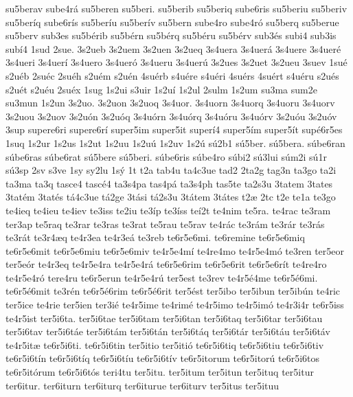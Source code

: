 {su5berav
sube4r^^e1
su5beren
su5beri.
su5berib
su5beriq
sube6ris
su5beriu
su5beriv
su5ber^^edq
sube6r^^eds
su5ber^^edu
su5ber^^edv
su5bern
sube4ro
sube4r^^f3
su5berq
su5berue
su5berv
sub3es
su5b^^e9rib
su5b^^e9rn
su5b^^e9rq
su5b^^e9ru
su5b^^e9rv
sub3^^e9s
subi4
sub3is
sub^^ed4
1sud
2sue.
3s2ueb
3s2uem
3s2uen
3s2ueq
3s4uera
3s4uer^^e1
3s4uere
3s4uer^^e9
3s4ueri
3s4uer^^ed
3s4uero
3s4uer^^f3
3s4ueru
3s4uer^^fa
3s2ues
3s2uet
3s2ueu
3suev
1su^^e9
s2u^^e9b
2su^^e9c
2su^^e9h
s2u^^e9m
s2u^^e9n
4su^^e9rb
s4u^^e9re
s4u^^e9ri
4su^^e9rs
4su^^e9rt
s4u^^e9ru
s2u^^e9s
s2u^^e9t
s2u^^e9u
2su^^e9x
1sug
1s2ui
s3uir
1s2u^^ed
1s2ul
2sulm
1s2um
su3ma
sum2e
su3mun
1s2un
3s2uo.
3s2uon
3s2uoq
3s4uor.
3s4uorn
3s4uorq
3s4uoru
3s4uorv
3s2uou
3s2uov
3s2u^^f3n
3s2u^^f3q
3s4u^^f3rn
3s4u^^f3rq
3s4u^^f3ru
3s4u^^f3rv
3s2u^^f3u
3s2u^^f3v
3sup
supere6ri
supere6r^^ed
super5im
super5it
super^^ed4
super5^^edm
super5^^edt
sup^^e96r5es
1suq
1s2ur
1s2us
1s2ut
1s2uu
1s2u^^fa
1s2uv
1s2^^fa
s^^fa2b1
s^^fa5ber.
s^^fa5bera.
s^^fabe6ran
s^^fabe6ras
s^^fabe6rat
s^^fa5bere
s^^fa5beri.
s^^fabe6ris
s^^fabe4ro
s^^fabi2
s^^fa3lui
s^^fam2i
s^^fa1r
s^^fa3sp
2sv
s3ve
1sy
sy2lu
1s^^fd
1t
t2a
tab4u
ta4c3ue
tad2
2ta2g
tag3n
ta3go
ta2i
ta3ma
ta3q
tasce4
tasc^^e94
ta3s4pa
tas4p^^e1
ta3s4ph
tas5te
ta2s3u
3tatem
3tates
3tat^^e9m
3tat^^e9s
t^^e14c3ue
t^^e12ge
3t^^e1si
t^^e12s3u
3t^^e1tem
3t^^e1tes
t2^^e6
2tc
t2e
te1a
te3go
te4ieq
te4ieu
te4iev
te3iss
te2iu
te3^^edp
te3^^edss
te^^ed2t
te4nim
te5ra.
te4rac
te3ram
ter3ap
te5raq
te3rar
te3ras
te3rat
te5rau
te5rav
te4r^^e1c
te3r^^e1m
te3r^^e1r
te3r^^e1s
te3r^^e1t
te3r4^^e6q
te4r3ea
te4r3e^^e1
te3reb
te6r5e6mi.
te6remine
te6r5e6miq
te6r5e6mit
te6r5e6miu
te6r5e6miv
te4r5e4m^^ed
te4re4mo
te4r5e4m^^f3
te3ren
ter5eor
ter5e^^f3r
te4r3eq
te4r5e4ra
te4r5e4r^^e1
te6r5e6rim
te6r5e6rit
te6r5e6r^^edt
te4re4ro
te4r5e4r^^f3
tere4ru
te6r5erun
te4r5e4r^^fa
ter5est
te3rev
te4r5^^e94me
te6r5^^e96mi.
te6r5^^e96mit
te3r^^e9n
te6r5^^e96rim
te6r5^^e96rit
ter5^^e9st
ter5ibo
ter5ibun
ter5ib^^fan
te4ric
ter5ice
te4rie
ter5ien
ter3i^^e9
te4r5ime
te4rim^^e9
te4r5imo
te4r5im^^f3
te4r3i4r
te6r5iss
te4r5ist
ter5i6ta.
ter5i6tae
ter5i6tam
ter5i6tan
ter5i6taq
ter5i6tar
ter5i6tau
ter5i6tav
ter5i6t^^e1e
ter5i6t^^e1m
ter5i6t^^e1n
ter5i6t^^e1q
ter5i6t^^e1r
ter5i6t^^e1u
ter5i6t^^e1v
te4r5it^^e6
te6r5i6ti.
te6r5i6tin
ter5itio
ter5iti^^f3
te6r5i6tiq
te6r5i6tiu
te6r5i6tiv
te6r5i6t^^edn
te6r5i6t^^edq
te6r5i6t^^edu
te6r5i6t^^edv
te6r5itorum
te6r5itor^^fa
te6r5i6tos
te6r5it^^f3rum
te6r5i6t^^f3s
teri4tu
ter5itu.
ter5itum
ter5itun
ter5ituq
ter5itur
ter6itur.
ter6iturn
ter6iturq
ter6iturue
ter6iturv
ter5itus
ter5ituu
}
